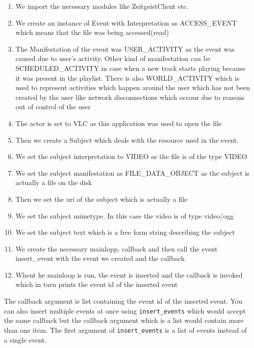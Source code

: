 \begin{enumerate}
\item We import the necessary modules like ZeitgeistClient etc.
\item We create an instance of Event with Interpretation as ACCESS\_EVENT which 
means that the file was being accessed(read)
\item The Manifestation of the event was USER\_ACTIVITY as the event was caused due 
to user's activity. Other kind of manifestation can be SCHEDULED\_ACTIVITY in case 
when a new track starts playing because it was present in the playlist. There is 
also WORLD\_ACTIVITY which is used to represent activities which happen around the 
user which has not been created by the user like network disconnections which 
occour due to reasons out of control of the user
\item The actor is set to VLC as this application was used to open the file
\item Then we create a Subject which deals with the resource used in the event.
\item We set the subject interpretation to VIDEO as the file is of the type VIDEO
\item We set the subject manifestation as FILE\_DATA\_OBJECT as the subject is 
actually a file on the disk
\item Then we set the uri of the subject which is actually a file
\item We set the subject mimetype. In this case the video is of type video/ogg
\item We set the subject text which is a free form string describing the subject
\item We create the necessary mainlopp, callback and then call the event insert\_event 
with the event  we created and the callback.
\item Whent he mainloop is run, the event is inserted and the callback is invoked 
which in turn prints the event id of the inserted event
\end{enumerate}

The callback argument is list containing the event id of the 
inserted event. You can also insert multiple events at once using 
\texttt{insert\_events} which would accept the same callback 
but the callback argument which is a list would contain more than 
one item. The first argument of \texttt{insert\_events} is a list 
of events instead of a single event.